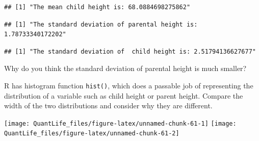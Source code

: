 \documentclass[
]{book}
\newenvironment{Shaded}{\begin{snugshade}}{\end{snugshade}}
\newcommand{\KeywordTok}[1]{\textcolor[rgb]{0.13,0.29,0.53}{\textbf{#1}}}
\newcommand{\NormalTok}[1]{#1}
\newcommand{\OperatorTok}[1]{\textcolor[rgb]{0.81,0.36,0.00}{\textbf{#1}}}
\newcommand{\StringTok}[1]{\textcolor[rgb]{0.31,0.60,0.02}{#1}}
\theoremstyle{definition}
\theoremstyle{definition}
\theoremstyle{definition}
\theoremstyle{remark}
\begin{document}
\begin{verbatim}
## [1] "The mean child height is: 68.0884698275862"
\end{verbatim}

\begin{Shaded}
\end{Shaded}

\begin{verbatim}
## [1] "The standard deviation of parental height is: 1.78733340172202"
\end{verbatim}

\begin{Shaded}
\end{Shaded}

\begin{verbatim}
## [1] "The standard deviation of  child height is: 2.51794136627677"
\end{verbatim}

Why do you think the standard deviation of parental height is much smaller?

R has histogram function \texttt{hist()}, which does a passable job of representing the distribution of a variable such as child height or parent height. Compare the width of the two distributions and consider why they are different.

\begin{Shaded}
\end{Shaded}

\begin{center}\texttt{[image: QuantLife\_files/figure-latex/unnamed-chunk-61-1]} \texttt{[image: QuantLife\_files/figure-latex/unnamed-chunk-61-2]} \end{center}
\end{document}
